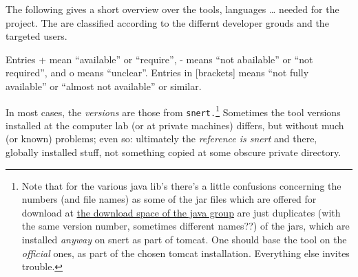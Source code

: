 The following gives a short overview over the tools, languages \ldots
needed for the project. The are classified according to the differnt
developer grouds and the targeted users.

Entries + mean ``available'' or ``require'', - means ``not abailable'' or
``not required'', and o means ``unclear''. Entries in [brackets] means
``not fully available'' or ``almost not available'' or similar.

In most cases, the \emph{versions} are those from
\texttt{snert.}\footnote{Note that for the various java lib's there's a
  little confusions concerning the numbers (and file names) as some of the
  jar files which are offered for download at
  \href{http://snert.informatik.uni-kiel.de:8080/~wprguest3/downloads/}{the
    download space of the java group} are just duplicates (with the same
  version number, sometimes different names??) of the jars, which are
  installed \emph{anyway} on snert as part of tomcat. One should base the
  tool on the \emph{official} ones, as part of the chosen tomcat
  installation. Everything else invites trouble.} Sometimes the tool
versions installed at the computer lab (or at private machines) differs,
but without much (or known) problems; even so: ultimately the
\emph{reference is snert} and there, globally installed stuff, not
something copied at some obscure private directory.



